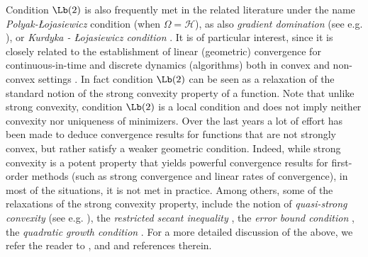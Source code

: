 \documentclass[reqno]{amsart}
\theoremstyle{plain}
\theoremstyle{definition}
\theoremstyle{remark}
\DeclarePairedDelimiter{\abs}{\lvert}{\rvert}	%
\DeclareMathOperator{\dist}{dist}	%
\newcommand{\VA}{\VAcomment}
\newcommand{\Gb}{\mathcal{G}}
\newcommand{\Hb}{\mathcal{H}}
\newcommand{\Qb}{\mathcal{Q}}
\begin{document}
Condition \hyperref[PL]{$\Lb(2)$} is also frequently met in the related literature under the name \textit{Polyak-\L ojasiewicz} condition \cite{polyak1963gradient,polyak1964some,Karimi2016} (when $\Omega =\Hb$), as also \textit{gradient domination} (see e.g. \cite[paragraph $4.1.3$]{nesterov2013introductory}), or \textit{Kurdyka - \L ojasiewicz condition} \cite{Kurdyka1998,Bolte2006,bolte2007lojasiewicz,bolte2010characterizations}.  It is of particular interest, since it is closely related to the establishment of linear (geometric) convergence for continuous-in-time and discrete dynamics (algorithms) both in convex and non-convex settings \cite{polyak1963gradient,polyak1964some,Karimi2016,bolte2017error,garrigos2017convergence}.  In fact condition \hyperref[PL]{$\Lb(2)$} can be seen as a relaxation of the standard notion of the strong convexity property of a function. Note that unlike strong convexity, condition \hyperref[PL]{$\Lb(2)$} is a local condition and does not imply neither convexity nor uniqueness of minimizers. 
Over the last years a lot of effort has been made to deduce convergence results for functions that are not strongly convex, but rather satisfy a weaker geometric condition. Indeed, while strong convexity is a potent property that yields powerful convergence results for first-order methods (such as strong convergence and linear rates of convergence), in most of the situations, it is not met in practice. Among others, some of the relaxations of the strong convexity property, include the notion of \textit{quasi-strong convexity} (see e.g. \cite[Definition $1$]{necoara2019linear}), the \textit{restricted secant inequality} \cite[Definition $2$]{zhang2013gradient}, the \textit{error bound condition} \cite[Assumption A]{luo1993error}, the \textit{quadratic growth condition} \cite{penot1996conditioning,anitescu2000degenerate}. For a more detailed discussion of the above, we refer the reader to \cite{bolte2007lojasiewicz,bolte2010characterizations,bolte2017error}, \cite{necoara2019linear,Karimi2016,garrigos2017convergence} and \cite{zhang2020new,apidopoulos2022convergence} and references therein.
\end{document}
